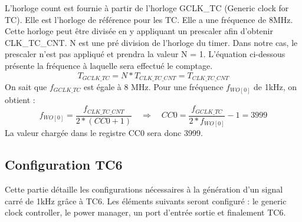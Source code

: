 \documentclass[a4paper]{article}
\begin{document}
	L'horloge count est fournie à partir de l’horloge GCLK\_TC (Generic clock for TC). Elle est l'horloge de référence pour les TC. Elle a une fréquence de 8MHz. Cette horloge peut être divisée en y appliquant un prescaler afin d’obtenir CLK\_TC\_CNT. N est une pré division de l’horloge du timer. Dans notre cas, le prescaler n’est pas appliqué et prendra la valeur N = 1. L'équation ci-dessous présente la fréquence à laquelle sera effectué le comptage. \\
	\begin{equation}
		T_{GCLK\_TC} = N*T_{CLK\_TC\_CNT} = T_{CLK\_TC\_CNT}
	\end{equation}
	On sait que $f_{GCLK\_TC}$ est égale à 8 MHz. Pour une fréquence $f_{WO[0]}$ de 1kHz, on obtient :
	\begin{equation}
		f_{WO[0]} = \frac{f_{CLK\_TC\_CNT}}{2*(CC0+1)}
		\quad \Rightarrow \quad 
		CC0 = \frac{f_{GCLK\_TC}}{2*f_{WO[0]}} - 1 = 3999
	\end{equation}
	La valeur chargée dans le registre CC0 sera donc 3999.
	
	\subsection{Configuration TC6}
	Cette partie détaille les configurations nécessaires à la génération d'un signal carré de 1kHz grâce à TC6. Les éléments suivants seront configuré : le generic clock controller, le power manager, un port d'entrée sortie et finalement TC6.
\end{document}
